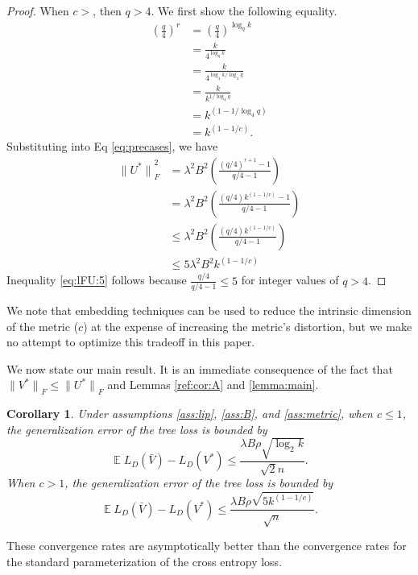 \documentclass[twoside]{article}
\newtheorem{corollary}{Corollary}
\DeclareMathOperator{\E}{\mathbb E}
\renewcommand{\star}[1]{{#1}^{*}}
\newcommand{\lF}[1]{{\lVert {#1} \rVert}_F}
\begin{document}
{\begin{proof}
When $c>$, then $q>4$.
We first show the following equality.
\begin{align}
\left(\frac q 4\right)^r
&=
\left(\frac q 4\right)^{\log_q k}\\
&=
\frac{k}{4^{\log_q k}}\\
&=
\frac{k}{4^{{\log_4 k}/{\log_4 q}}}\\
&=
\frac{k}{k^{1/\log_4 q}}\\
&=
k^{\left(1 - {1}/{\log_4 q}\right)} \\
&=
k^{\left(1 - 1/c\right)}
.
\label{eq:lFU:frac}
\end{align}
Substituting into Eq \eqref{eq:precases}, we have
\begin{align}
    \lF{\star U}^2
    &= \lambda^2B^2 \left(\frac{(q/4)^{r+1}-1}{q/4-1}\right) \\
    \label{eq:lFU:4}
    &= \lambda^2B^2 \left(\frac{(q/4)k^{(1-1/c)}-1}{q/4-1}\right) \\
    &\le \lambda^2B^2 \left(\frac{(q/4)k^{(1-1/c)}}{q/4-1}\right) \\
    &\le 5 \lambda^2B^2 k^{(1-1/c)}
    \label{eq:lFU:5}
\end{align}
    Inequality \eqref{eq:lFU:5} follows because $\tfrac{q/4}{q/4-1} \le 5$ for integer values of $q>4$.
\end{proof}
We note that embedding techniques can be used to reduce the intrinsic dimension of the metric ($c$) at the expense of increasing the metric's distortion,
but we make no attempt to optimize this tradeoff in this paper.

We now state our main result.
It is an immediate consequence of the fact that $\lF{\star V} \le \lF{\star U}$ and Lemmas \ref{ref:cor:A} and \ref{lemma:main}.
\begin{corollary}
    \label{cor:main}
    Under assumptions \ref{ass:lip}, \ref{ass:B}, and \ref{ass:metric},
    when $c\le1$, the generalization error of the tree loss is bounded by
\begin{equation}
    \E L_D(\bar V) - L_D(V^*)
    \le \frac {\lambda B\rho \sqrt{\log_2 k}}{\sqrt 2n}
    .
\end{equation}
    When $c>1$, the generalization error of the tree loss is bounded by
\begin{equation}
    \E L_D(\bar V) - L_D(V^*)
    \le \frac {\lambda B\rho \sqrt{5 k^{(1-1/c)}}}{\sqrt n}
    .
\end{equation}
\end{corollary}
These convergence rates are asymptotically better than the convergence rates for the standard parameterization of the cross entropy loss.
}
\end{document}
